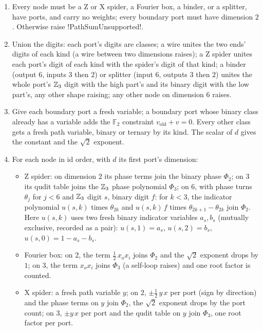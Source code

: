 \begin{algorithm}\label{alg:semantics-mixed-sum}
\begin{enumerate}
\item Every node must be a Z or X spider, a Fourier box, a binder, or a splitter, have ports, and carry no weights; every boundary port must have dimension $2$. Otherwise raise \py!PathSumUnsupported!.
\item Union the digits: each port's digits are classes; a wire unites the two ends' digits of each kind (a wire between two dimensions raises); a Z spider unites each port's digit of each kind with the spider's digit of that kind; a binder (output $6$, inputs $3$ then $2$) or splitter (input $6$, outputs $3$ then $2$) unites the whole port's $\mathbb{Z}_3$ digit with the high part's and its binary digit with the low part's, any other shape raising; any other node on dimension $6$ raises.
\item Give each boundary port a fresh variable; a boundary port whose binary class already has a variable adds the $\mathbb F_2$ constraint $v_{\text{old}}+v=0$. Every other class gets a fresh path variable, binary or ternary by its kind. The scalar of $d$ gives the constant and the $\sqrt2$ exponent.
\item For each node in id order, with $d$ its first port's dimension:
\begin{itemize}
\item Z spider: on dimension $2$ its phase terms join the binary phase $\Phi_2$; on $3$ its qudit table joins the $\mathbb{Z}_3$ phase polynomial $\Phi_3$; on $6$, with phase turns $\theta_j$ for $j<6$ and $\mathbb{Z}_3$ digit $s$, binary digit $f$: for $k<3$, the indicator polynomial $u(s,k)$ times $\theta_{2k}$ and $u(s,k)\,f$ times $\theta_{2k+1}-\theta_{2k}$ join $\Phi_2$. Here $u(s,k)$ uses two fresh binary indicator variables $a_s,b_s$ (mutually exclusive, recorded as a pair): $u(s,1)=a_s$, $u(s,2)=b_s$, $u(s,0)=1-a_s-b_s$.
\item Fourier box: on $2$, the term $\tfrac12\,x_ox_i$ joins $\Phi_2$ and the $\sqrt2$ exponent drops by $1$; on $3$, the term $x_ox_i$ joins $\Phi_3$ (a self-loop raises) and one root factor is counted.
\item X spider: a fresh path variable $y$; on $2$, $\pm\tfrac12\,y\,x$ per port (sign by direction) and the phase terms on $y$ join $\Phi_2$, the $\sqrt2$ exponent drops by the port count; on $3$, $\pm y\,x$ per port and the qudit table on $y$ join $\Phi_3$, one root factor per port.
\end{itemize}

\end{enumerate}
\end{algorithm}
